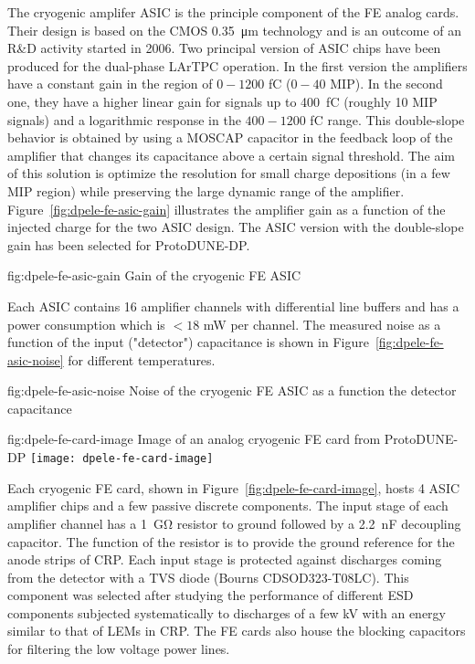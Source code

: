 The cryogenic amplifer ASIC is the principle component of the FE analog cards. Their design is based on the CMOS \SI{0.35}{\micro\meter} technology and is an outcome of an R\&D  activity started in 2006. Two principal version of ASIC chips have been produced for the dual-phase LArTPC operation. In the first version the amplifiers have a constant gain in the region of $0-1200$ \si{\femto\coulomb} ($0-40$ MIP). In the second one, they have a higher linear gain for signals up to \SI{400}{\femto\coulomb} (roughly 10 MIP signals) and a logarithmic response in the  $400-1200$ \si{\femto\coulomb} range. This double-slope behavior is obtained by using a MOSCAP capacitor in the feedback loop of the amplifier that changes its capacitance above a certain signal threshold. The aim of this solution is optimize the resolution for small charge depositions (in a few MIP region) while preserving the large dynamic range of the amplifier. Figure~\ref{fig:dpele-fe-asic-gain} illustrates the amplifier gain as a function of the injected charge for the two ASIC design. The ASIC version with the double-slope gain has been selected for ProtoDUNE-DP. 

\begin{dunefigure}{fig:dpele-fe-asic-gain}
{Gain of the cryogenic FE ASIC}
\end{dunefigure}

Each ASIC contains 16 amplifier channels with differential line buffers and has a power consumption which is $<18$ mW per channel. The measured noise as a function of the input ("detector")  capacitance is shown in Figure~\ref{fig:dpele-fe-asic-noise} for different temperatures.  

\begin{dunefigure}{fig:dpele-fe-asic-noise}
{Noise of the cryogenic FE ASIC as a function the detector capacitance}
\end{dunefigure}

\begin{dunefigure}{fig:dpele-fe-card-image}
{Image of an analog cryogenic FE card from ProtoDUNE-DP}
\texttt{[image: dpele-fe-card-image]}
\end{dunefigure}

Each cryogenic FE card, shown in Figure~\ref{fig:dpele-fe-card-image}, hosts 4 ASIC amplifier chips and a few passive discrete components. The input stage of each amplifier channel has a \SI{1}{\giga\ohm} resistor to ground followed by a \SI{2.2}{\nano\farad} decoupling capacitor. The function of the resistor is to provide the ground reference for the anode strips of CRP. Each input stage is protected against discharges coming from the detector with a TVS diode (Bourns CDSOD323-T08LC). This component was selected after studying the performance of different ESD components subjected systematically to discharges of a few kV with an energy similar to that of LEMs in CRP. The FE cards also house the blocking capacitors for filtering the low voltage power lines.


